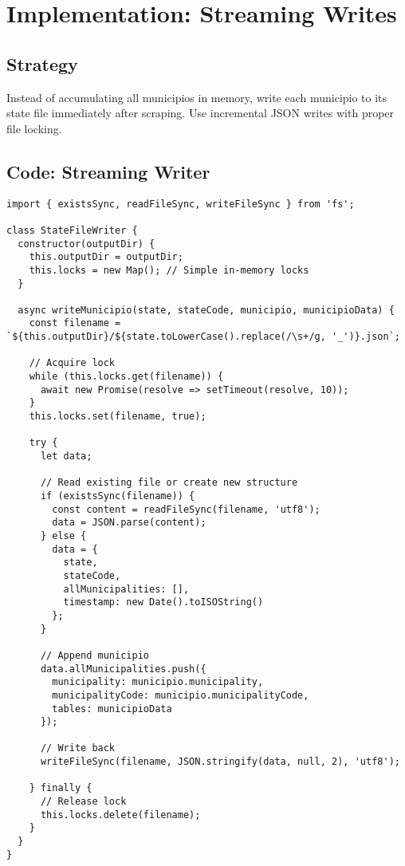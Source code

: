 \documentclass[11pt,a4paper]{article}
\begin{document}
\section{Implementation: Streaming Writes}

\subsection{Strategy}

Instead of accumulating all municipios in memory, write each municipio to its state file immediately after scraping. Use incremental JSON writes with proper file locking.

\subsection{Code: Streaming Writer}

\begin{lstlisting}[caption={Stream Writer with Incremental JSON}]
import { existsSync, readFileSync, writeFileSync } from 'fs';

class StateFileWriter {
  constructor(outputDir) {
    this.outputDir = outputDir;
    this.locks = new Map(); // Simple in-memory locks
  }

  async writeMunicipio(state, stateCode, municipio, municipioData) {
    const filename = `${this.outputDir}/${state.toLowerCase().replace(/\s+/g, '_')}.json`;

    // Acquire lock
    while (this.locks.get(filename)) {
      await new Promise(resolve => setTimeout(resolve, 10));
    }
    this.locks.set(filename, true);

    try {
      let data;

      // Read existing file or create new structure
      if (existsSync(filename)) {
        const content = readFileSync(filename, 'utf8');
        data = JSON.parse(content);
      } else {
        data = {
          state,
          stateCode,
          allMunicipalities: [],
          timestamp: new Date().toISOString()
        };
      }

      // Append municipio
      data.allMunicipalities.push({
        municipality: municipio.municipality,
        municipalityCode: municipio.municipalityCode,
        tables: municipioData
      });

      // Write back
      writeFileSync(filename, JSON.stringify(data, null, 2), 'utf8');

    } finally {
      // Release lock
      this.locks.delete(filename);
    }
  }
}
\end{lstlisting}
\end{document}
